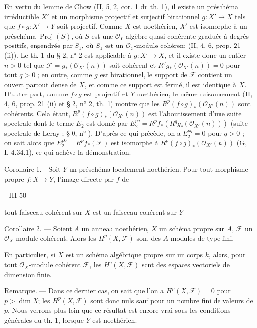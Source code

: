 En vertu du lemme de Chow (II, 5, 2, cor. 1 du th. 1), il existe un préschéma irréductible $X'$ et un morphisme projectif et surjectif birationnel $g: X' \to X$ tels que $f \circ g : X' \to Y$ soit projectif. Comme $X$ est noethérien, $X'$ est isomorphe à un préschéma $\operatorname{Proj}(S)$, où $S$ est une $\mathcal{O}_Y$-algèbre quasi-cohérente graduée à degrés positifs, engendrée par $S_1$, où $S_1$ est un $\mathcal{O}_Y$-module cohérent (II, 4, 6, prop. 21 (ii)). Le th. 1 du § 2, n° 2 est applicable à $g: X' \to X$, et il existe donc un entier $n > 0$ tel que $\mathcal{F} = g_* (\mathcal{O}_{X'}(n))$ soit cohérent et $R^q g_* (\mathcal{O}_{X'}(n)) = 0$ pour tout $q > 0$ ; en outre, comme $g$ est birationnel, le support de $\mathcal{F}$ contient un ouvert partout dense de $X$, et comme ce support est fermé, il est identique à $X$. D'autre part, comme $f \circ g$ est projectif et $Y$ noethérien, le même raisonnement (II, 4, 6, prop. 21 (ii) et § 2, n° 2, th. 1) montre que les $R^p(f \circ g)_* (\mathcal{O}_{X'}(n))$ sont cohérents. Cela étant, $R^p(f \circ g)_* (\mathcal{O}_{X'}(n))$ est l'aboutissement d'une suite spectrale dont le terme $E_2$ est donné par $E_2^{pq} = R^p f_* (R^q g_* (\mathcal{O}_{X'}(n)))$ (suite spectrale de Leray ; § 0, n° ). D'après ce qui précède, on a $E_2^{pq} = 0$ pour $q > 0$ ; on sait alors que $E_2^{p0} = R^p f_* (\mathcal{F})$ est isomorphe à $R^p(f \circ g)_* (\mathcal{O}_{X'}(n))$ (G, I, 4.34.1), ce qui achève la démonstration.

Corollaire 1. - Soit $Y$ un préschéma localement noethérien. Pour tout morphisme propre $f: X \to Y$, l'image directe par $f$ de

\newpage


- III-50 -

tout faisceau cohérent sur $X$ est un faisceau cohérent sur $Y$.

Corollaire 2. — Soient $A$ un anneau noethérien, $X$ un schéma propre sur $A$, $\mathcal{F}$ un $\mathcal{O}_X$-module cohérent. Alors les $H^p(X, \mathcal{F})$ sont des $A$-modules de type fini.

En particulier, si $X$ est un schéma algébrique propre sur un corps $k$, alors, pour tout $\mathcal{O}_X$-module cohérent $\mathcal{F}$, les $H^p(X, \mathcal{F})$ sont des espaces vectoriels de dimension finie.

Remarque. — Dans ce dernier cas, on sait que l'on a $H^p(X, \mathcal{F}) = 0$ pour $p > \dim X$; les $H^p(X, \mathcal{F})$ sont donc nuls sauf pour un nombre fini de valeurs de $p$. Nous verrons plus loin que ce résultat est encore vrai sous les conditions générales du th. 1, lorsque $Y$ est noethérien.

